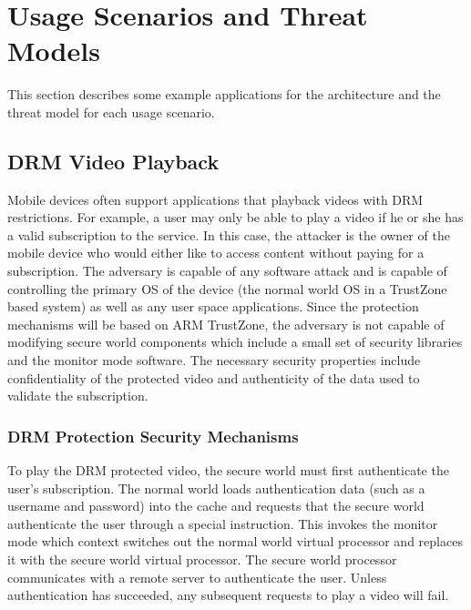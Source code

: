 \section{Usage Scenarios and Threat Models}
    This section describes some example applications for the architecture and 
    the threat model for each usage scenario.

    \subsection{DRM Video Playback}
    Mobile devices often support applications that playback videos with
    DRM restrictions. For example, a user may only be able to play a video if 
    he or she has a valid subscription to the service. In this case, the 
    attacker is the owner of the mobile device who would either like to access 
    content without paying for a subscription. The adversary is capable of any 
    software attack and is capable of controlling the primary OS of the device 
    (the normal world OS in a TrustZone based system) as well as any user space 
    applications. Since the protection mechanisms will be based on ARM 
    TrustZone, the adversary is not capable of modifying secure world 
    components which include a small set of security libraries and the monitor 
    mode software. The necessary security properties include confidentiality of 
    the protected video and authenticity of the data used to validate the 
    subscription.

    \subsubsection{DRM Protection Security Mechanisms}
    
    To play the DRM protected video, the secure world must first authenticate 
    the user's subscription. The normal world loads authentication data (such 
    as a username and password) into the cache and requests that the secure 
    world authenticate the user through a special instruction. This invokes the 
    monitor mode which context switches out the normal world virtual processor 
    and replaces it with the secure world virtual processor. The secure world 
    processor communicates with a remote server to authenticate the user.  
    Unless authentication has succeeded, any subsequent requests to play a 
    video will fail.

